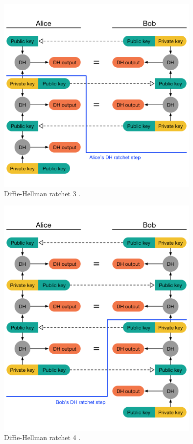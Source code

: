 \begin{figure}[H]
	\centering
	\includegraphics[width=10cm]{figures/dhratchet3.png}
	\caption{Diffie-Hellman ratchet 3 \cite{doubleratchet}.}
	\label{fig:dhratchet3}
\end{figure}

\begin{figure}[H]
	\centering
	\includegraphics[width=10cm]{figures/dhratchet4.png}
	\caption{Diffie-Hellman ratchet 4 \cite{doubleratchet}.}
	\label{fig:dhratchet4}
\end{figure}

